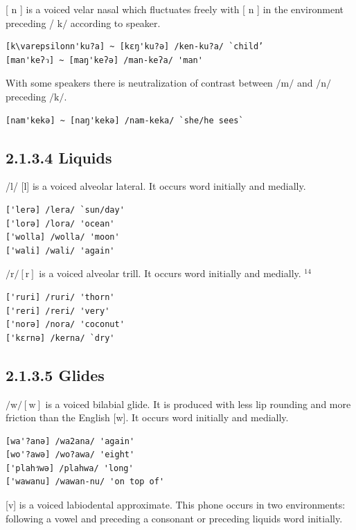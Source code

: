 \documentclass[10pt]{article}
\begin{document}
[ n ] is a voiced velar nasal which fluctuates freely with [ n ] in the environment preceding / \(\mathrm{k} /\) according to speaker.

\begin{verbatim}
[k\varepsilonn'ku?a] ~ [kɛŋ'ku?ə] /ken-ku?a/ `child’
[man'keʔว] ~ [maŋ'keʔə] /man-keʔa/ 'man'
\end{verbatim}

With some speakers there is neutralization of contrast between \(/ \mathrm{m} /\) and \(/ \mathrm{n} /\) preceding \(/ \mathrm{k} /\).

\begin{verbatim}
[nam'kekə] ~ [naŋ'kekə] /nam-keka/ `she/he sees`
\end{verbatim}

\subsection*{2.1.3.4 Liquids}
/l/ [l] is a voiced alveolar lateral. It occurs word initially and medially.

\begin{verbatim}
['lerə] /lera/ `sun/day'
['lorә] /lora/ 'ocean'
['wolla] /wolla/ 'moon'
['wali] /wali/ 'again'
\end{verbatim}

\(/ \mathrm{r} /[\mathrm{r}]\) is a voiced alveolar trill. It occurs word initially and medially. \({ }^{14}\)

\begin{verbatim}
['ruri] /ruri/ 'thorn'
['reri] /reri/ 'very'
['norә] /nora/ 'coconut'
['kɛrnә] /kerna/ `dry'
\end{verbatim}

\subsection*{2.1.3.5 Glides}
\(/ \mathrm{w} /[\mathrm{w}]\) is a voiced bilabial glide. It is produced with less lip rounding and more friction than the English [w]. It occurs word initially and medially.

\begin{verbatim}
[wa'?anә] /wa2ana/ 'again'
[wo'?awә] /wo?awa/ 'eight'
['plahว̆wə] /plahwa/ 'long'
['wawanu] /wawan-nu/ 'on top of'
\end{verbatim}

[v] is a voiced labiodental approximate. This phone occurs in two environments: following a vowel and preceding a consonant or preceding liquids word initially.
\end{document}
